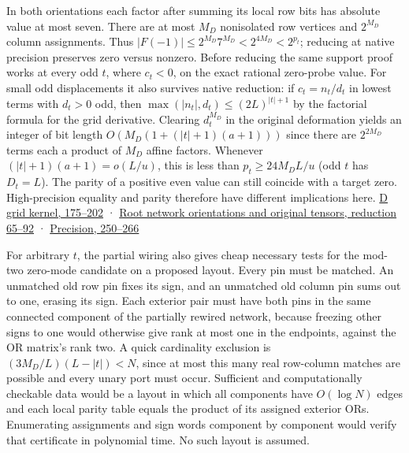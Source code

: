 \documentclass[11pt,a4paper]{article}
\begin{document}
In both orientations each factor after summing its local row bits has
absolute value at most seven. There are at most \(M_D\) nonisolated row
vertices and \(2^{M_D}\) column assignments. Thus
\(|F(-1)|\le 2^{M_D}7^{M_D}<2^{4M_D}<2^{p_t}\); reducing at native
precision preserves zero versus nonzero. Before reducing the same
support proof works at every odd \(t\), where \(c_t<0\), on the exact
rational zero-probe value. For small odd displacements it also survives
native reduction: if \(c_t=n_t/d_t\) in lowest terms with \(d_t>0\) odd,
then \(\max(|n_t|,d_t)\le(2L)^{|t|+1}\) by the factorial formula for the
grid derivative. Clearing \(d_t^{M_D}\) in the original deformation
yields an integer of bit length \(O(M_D(1+(|t|+1)(a+1)))\) since there
are \(2^{2M_D}\) terms each a product of \(M_D\) affine factors.
Whenever \((|t|+1)(a+1)=o(L/u)\), this is less than \(p_t\ge 24M_D L/u\)
(odd \(t\) has \(D_t=L\)). The parity of a positive even value can still
coincide with a target zero. High-precision equality and parity
therefore have different implications here.
\href{https://github.com/openai/math/blob/main/preprints/The-Exponential-Time-Hypothesis-is-False-October-25-2026/build/quantitative-contraction.tex\#L175}{D
grid kernel, 175--202} ·
\href{https://github.com/openai/math/blob/main/preprints/The-Exponential-Time-Hypothesis-is-False-October-25-2026/build/quantitative-reduction.tex\#L65}{Root
network orientations and original tensors, reduction 65--92} ·
\href{https://github.com/openai/math/blob/main/preprints/The-Exponential-Time-Hypothesis-is-False-October-25-2026/build/quantitative-contraction.tex\#L250}{Precision,
250--266}

For arbitrary \(t\), the partial wiring also gives cheap necessary tests
for the mod-two zero-mode candidate on a proposed layout. Every pin must
be matched. An unmatched old row pin fixes its sign, and an unmatched
old column pin sums out to one, erasing its sign. Each exterior pair
must have both pins in the same connected component of the partially
rewired network, because freezing other signs to one would otherwise
give rank at most one in the endpoints, against the OR matrix's rank
two. A quick cardinality exclusion is \((3M_D/L)(L-|t|)<N\), since at
most this many real row-column matches are possible and every unary port
must occur. Sufficient and computationally checkable data would be a
layout in which all components have \(O(\log N)\) edges and each local
parity table equals the product of its assigned exterior ORs.
Enumerating assignments and sign words component by component would
verify that certificate in polynomial time. No such layout is assumed.
\end{document}
